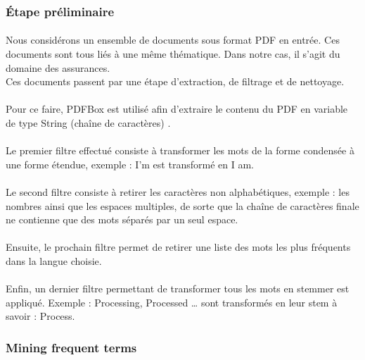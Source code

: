 \documentclass[12pt, a4paper, oneside]{book}
\begin{document}
\subsubsection{Étape préliminaire}

\paragraph{} 
Nous considérons un ensemble de documents sous format  PDF en entrée. Ces documents sont tous liés à une même thématique. Dans notre cas, il s'agit du domaine des assurances.\\
Ces documents passent par une étape d'extraction, de filtrage et de nettoyage.
\paragraph{} 
Pour ce faire, PDFBox est utilisé afin d'extraire le contenu du PDF en variable de type String (chaîne de caractères) \cite{apache}.
\paragraph{} 
Le premier filtre effectué consiste à transformer les mots de la forme condensée à une forme étendue, exemple : I'm est transformé en I am.
\paragraph{} 
Le second filtre consiste à retirer les caractères non alphabétiques, exemple : les nombres ainsi que les espaces multiples, de sorte que la chaîne de caractères finale ne contienne que des mots séparés par un seul espace.
\paragraph{} 
Ensuite, le prochain filtre permet de retirer une liste des mots les plus fréquents dans la langue choisie.
\paragraph{} 
Enfin, un dernier filtre permettant de transformer tous les mots en stemmer est appliqué. Exemple : Processing, Processed … sont transformés en leur stem à savoir : Process.


\subsubsection{Mining frequent terms}
\end{document}
